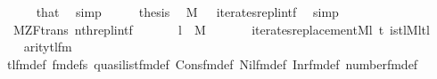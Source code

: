 \begin{isabellebody}
\ \ \ \ \isamarkupfalse%
\ that\ \isamarkupfalse%
\ simp\isanewline
\ \ \isamarkupfalse%
\ \isamarkupfalse%
\ {\isacharquery}{\kern0pt}thesis\ \isamarkupfalse%
\ {\isacartoucheopen}{}{\isasymin}M{\isacartoucheclose}\ {}\ {}\ iterates{\isacharunderscore}{\kern0pt}repl{\isacharunderscore}{\kern0pt}intf\ \isamarkupfalse%
\ simp\isanewline
{}\isamarkupfalse%
%
\endisatagproof
{\isafoldproof}%
%
\isadelimproof
\isanewline
%
\endisadelimproof
\isanewline
{}\isamarkupfalse%
\ {\isacharparenleft}{\kern0pt}\ M{\isacharunderscore}{\kern0pt}ZF{\isacharunderscore}{\kern0pt}trans{\isacharparenright}{\kern0pt}\ nth{\isacharunderscore}{\kern0pt}repl{\isacharunderscore}{\kern0pt}intf{\isacharcolon}{\kern0pt}\isanewline
\ \ \isanewline
\ \ \ \ {\isachardoublequoteopen}l\ {\isasymin}\ M{\isachardoublequoteclose}\isanewline
\ \ \isanewline
\ \ \ \ {\isachardoublequoteopen}iterates{\isacharunderscore}{\kern0pt}replacement{\isacharparenleft}{\kern0pt}{\isacharhash}{\kern0pt}{\isacharhash}{\kern0pt}M{\isacharcomma}{\kern0pt}{\isasymlambda}l{\isacharprime}{\kern0pt}\ t{\isachardot}{\kern0pt}\ is{\isacharunderscore}{\kern0pt}tl{\isacharparenleft}{\kern0pt}{\isacharhash}{\kern0pt}{\isacharhash}{\kern0pt}M{\isacharcomma}{\kern0pt}l{\isacharprime}{\kern0pt}{\isacharcomma}{\kern0pt}t{\isacharparenright}{\kern0pt}{\isacharcomma}{\kern0pt}l{\isacharparenright}{\kern0pt}{\isachardoublequoteclose}\isanewline
%
\isadelimproof
%
\endisadelimproof
%
\isatagproof
{}\isamarkupfalse%
\ {\isacharminus}{\kern0pt}\isanewline
\ \ \isamarkupfalse%
\ {}{\isacharcolon}{\kern0pt}{\isachardoublequoteopen}arity{\isacharparenleft}{\kern0pt}tl{\isacharunderscore}{\kern0pt}fm{\isacharparenleft}{\kern0pt}{}{\isacharcomma}{\kern0pt}{}{\isacharparenright}{\kern0pt}{\isacharparenright}{\kern0pt}\ {\isacharequal}{\kern0pt}\ {}{\isachardoublequoteclose}\isanewline
\ \ \ \ \isamarkupfalse%
\ tl{\isacharunderscore}{\kern0pt}fm{\isacharunderscore}{\kern0pt}def\ fm{\isacharunderscore}{\kern0pt}defs\ quasilist{\isacharunderscore}{\kern0pt}fm{\isacharunderscore}{\kern0pt}def\ Cons{\isacharunderscore}{\kern0pt}fm{\isacharunderscore}{\kern0pt}def\ Nil{\isacharunderscore}{\kern0pt}fm{\isacharunderscore}{\kern0pt}def\ Inr{\isacharunderscore}{\kern0pt}fm{\isacharunderscore}{\kern0pt}def\ number{}{\isacharunderscore}{\kern0pt}fm{\isacharunderscore}{\kern0pt}def\isanewline

\end{isabellebody}

